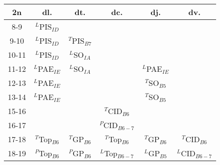 \documentclass{article}
\begin{document}
\begin{tabular}{c|ccccc}
2n	& dl.			& dt.			& dc.			& dj.			& dv.			\\\hline
8-9	& $^L$PIS$_{ID}$	&			&			&			&			\\
9-10	& $^L$PIS$_{ID}$	& $^T$PIS$_{B7}$	&			&			&			\\\hline
10-11	& $^L$PIS$_{ID}$	& $^L$SO$_{IA}$		&			&			&			\\
11-12	& $^L$PAE$_{IE}$	& $^L$SO$_{IA}$		&			& $^L$PAE$_{IE}$	&			\\\hline
12-13	& $^L$PAE$_{IE}$	&			&			& $^T$SO$_{B5}$		&			\\
13-14	& $^L$PAE$_{IE}$	&			&			& $^T$SO$_{B5}$		&			\\\hline\hline
15-16	&			&			& $^T$CID$_{B6}$	&			&			\\
16-17	&			&			& $^P$CID$_{B6-7}$	&			&			\\\hline
17-18	& $^T$Top$_{B6}$	& $^T$GP$_{B6}$		& $^T$Top$_{B6}$	& $^T$GP$_{B6}$		& $^T$CID$_{B6}$	\\
18-19	& $^P$Top$_{B6}$	& $^P$GP$_{B6}$		& $^L$Top$_{B6-7}$	& $^L$GP$_{B5}$		& $^L$CID$_{B6-7}$	\\
\end{tabular}
\end{document}
